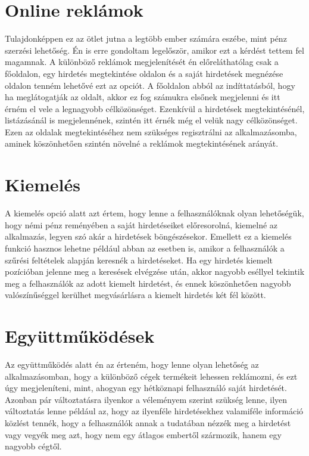 \documentclass[]{thesis-ekf}
\theoremstyle{definition}
\theoremstyle{remark}
\begin{document}
		 \section{Online reklámok}
		 	Tulajdonképpen ez az ötlet jutna a legtöbb ember számára eszébe, mint pénz szerzési lehetőség. Én is erre gondoltam legelőször, amikor ezt a kérdést tettem fel magamnak. A különböző reklámok megjelenítését én előreláthatólag csak a főoldalon, egy hirdetés megtekintése oldalon és a saját hirdetések megnézése oldalon tenném lehetővé ezt az opciót. A főoldalon abból az indíttatásból, hogy ha meglátogatják az oldalt, akkor ez fog számukra elsőnek megjelenni és itt érném el vele a legnagyobb célközönséget. Ezenkívül a hirdetések megtekintésénél, listázásánál is megjelennének, szintén itt érnék még el velük nagy célközönséget. Ezen az oldalak megtekintéséhez nem szükséges regisztrálni az alkalmazásomba, aminek köszönhetően szintén növelné a reklámok megtekintésének arányát.
		 \section{Kiemelés}
		 	A kiemelés opció alatt azt értem, hogy lenne a felhasználóknak olyan lehetőségük, hogy némi pénz reményében a saját hirdetéseiket előresorolná, kiemelné az alkalmazás, legyen szó akár a hirdetések böngészésekor. Emellett ez a kiemelés funkció hasznos lehetne például abban az esetben is, amikor a felhasználók a szűrési feltételek alapján keresnék a hirdetéseket. Ha egy hirdetés kiemelt pozícióban jelenne meg a keresések elvégzése után, akkor nagyobb eséllyel tekintik meg a felhasználók az adott kiemelt hirdetést, és ennek köszönhetően nagyobb valószínűséggel kerülhet megvásárlásra a kiemelt hirdetés két fél között.
		 \section{Együttműködések}
			Az együttműködés alatt én az érteném, hogy lenne olyan lehetőség az alkalmazásomban, hogy a különböző cégek termékeit lehessen reklámozni, és ezt úgy megjeleníteni, mint, ahogyan egy hétköznapi felhasználó saját hirdetését. Azonban pár változtatásra ilyenkor a véleményem szerint szükség lenne, ilyen változtatás lenne például az, hogy az ilyenféle hirdetésekhez valamiféle információ közlést tennék, hogy a felhasználók annak a tudatában nézzék meg a hirdetést vagy vegyék meg azt, hogy nem egy átlagos embertől szármozik, hanem egy nagyobb cégtől.
\end{document}
